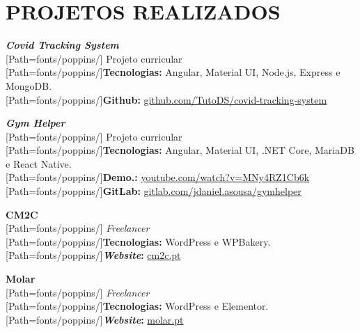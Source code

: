 \section*{\MakeUppercase{Projetos realizados}}

\begin{minipage}[t]{.4\textwidth}
\textbf{\textit{Covid Tracking System}}\\
{
	\scriptsize
	[Path=fonts/poppins/]
	Projeto curricular\\
	{[Path=fonts/poppins/]\textbf{Tecnologias:}} Angular, Material UI, Node.js, Express e MongoDB.\\
	{[Path=fonts/poppins/]\textbf{Github:}} \href{https://github.com/TutoDS/covid-tracking-system}{github.com/TutoDS/covid-tracking-system}
}
\end{minipage}\hspace{0.1\textwidth}
\begin{minipage}[t]{.4\textwidth}
\textbf{\textit{Gym Helper}}\\
{
	\scriptsize
	[Path=fonts/poppins/]
	Projeto curricular\\
	{[Path=fonts/poppins/]\textbf{Tecnologias:}} Angular, Material UI, .NET Core, MariaDB e React Native.\\
	{[Path=fonts/poppins/]\textbf{Demo.:}} \href{https://www.youtube.com/watch?v=MNy4RZ1Cb6k}{youtube.com/watch?v=MNy4RZ1Cb6k}\\
	{[Path=fonts/poppins/]\textbf{GitLab:}} \href{https://gitlab.com/jdaniel.asousa/gymhelper}{gitlab.com/jdaniel.asousa/gymhelper}
}
\end{minipage}

\vspace{10pt}

\begin{minipage}[t]{.4\textwidth}
\textbf{CM2C}\\
{
	\scriptsize
	[Path=fonts/poppins/]
	\textit{Freelancer}\\
	{[Path=fonts/poppins/]\textbf{Tecnologias:}} WordPress e WPBakery.\\
	{[Path=fonts/poppins/]\textbf{\textit{Website}:}} \href{https://cm2c.pt}{cm2c.pt}
}
\end{minipage}\hspace{0.1\textwidth}
\begin{minipage}[t]{.4\textwidth}
\textbf{Molar}\\
{
	\scriptsize
	[Path=fonts/poppins/]
	\textit{Freelancer}\\
	{[Path=fonts/poppins/]\textbf{Tecnologias:}} WordPress e Elementor.\\
	{[Path=fonts/poppins/]\textbf{\textit{Website}:}} \href{https://molar.pt}{molar.pt}
}
\end{minipage}

